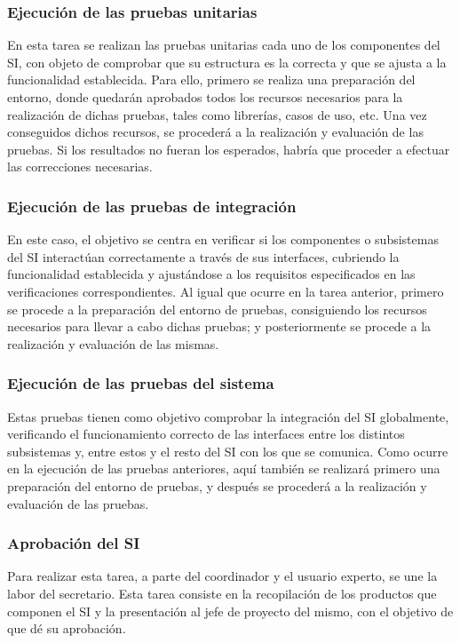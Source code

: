 \documentclass[11pt,a4paper,spanish,twoside]{book}
\begin{document}
\subsubsection{Ejecución de las pruebas unitarias}
En esta tarea se realizan las pruebas unitarias cada uno de los componentes 
del SI, con objeto de comprobar que su estructura es la correcta y que se 
ajusta a la funcionalidad establecida. Para ello, primero se realiza una 
preparación del entorno, donde quedarán aprobados todos los recursos necesarios
para la realización de dichas pruebas, tales como librerías, casos de uso, etc.
Una vez conseguidos dichos recursos, se procederá a la realización y evaluación
de las pruebas. Si los resultados no fueran los esperados, habría que proceder 
a efectuar las correcciones necesarias.

\subsubsection{Ejecución de las pruebas de integración}
En este caso, el objetivo se centra en verificar si los componentes o 
subsistemas del SI interactúan correctamente a través de sus interfaces, 
cubriendo la funcionalidad establecida y ajustándose a los requisitos 
especificados en las verificaciones correspondientes. Al igual que ocurre en la
tarea anterior, primero se procede a la preparación del entorno de pruebas, 
consiguiendo los recursos necesarios para llevar a cabo dichas pruebas; y 
posteriormente se procede a la realización y evaluación de las mismas.

\subsubsection{Ejecución de las pruebas del sistema}
Estas pruebas tienen como objetivo comprobar la integración del SI globalmente,
verificando el funcionamiento correcto de las interfaces entre los distintos 
subsistemas y, entre estos y el resto del SI con los que se comunica. Como 
ocurre en la ejecución de las pruebas anteriores, aquí también se realizará 
primero una preparación del entorno de pruebas, y después se procederá a la 
realización y evaluación de las pruebas.

\subsubsection{Aprobación del SI}
Para realizar esta tarea, a parte del coordinador y el usuario experto, se une 
la labor del secretario. Esta tarea consiste en la recopilación de los 
productos que componen el SI y la presentación al jefe de proyecto del mismo, 
con el objetivo de que dé su aprobación.
\end{document}
